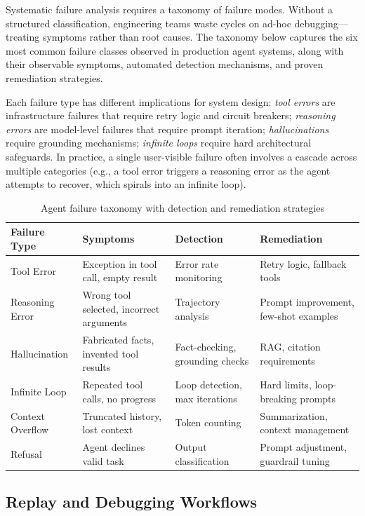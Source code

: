 Systematic failure analysis requires a taxonomy of failure modes. Without a structured classification, engineering teams waste cycles on ad-hoc debugging---treating symptoms rather than root causes. The taxonomy below captures the six most common failure classes observed in production agent systems, along with their observable symptoms, automated detection mechanisms, and proven remediation strategies.

Each failure type has different implications for system design: \emph{tool errors} are infrastructure failures that require retry logic and circuit breakers; \emph{reasoning errors} are model-level failures that require prompt iteration; \emph{hallucinations} require grounding mechanisms; \emph{infinite loops} require hard architectural safeguards. In practice, a single user-visible failure often involves a cascade across multiple categories (e.g., a tool error triggers a reasoning error as the agent attempts to recover, which spirals into an infinite loop).

\begin{table}[ht!]
\centering
\caption{Agent failure taxonomy with detection and remediation strategies}
\begin{tabular}{@{}lp{3.5cm}p{3.5cm}p{6cm}@{}}
\toprule
\textbf{Failure Type} & \textbf{Symptoms} & \textbf{Detection} & \textbf{Remediation} \\
\midrule
Tool Error & Exception in tool call, empty result & Error rate monitoring & Retry logic, fallback tools \\
Reasoning Error & Wrong tool selected, incorrect arguments & Trajectory analysis & Prompt improvement, few-shot examples \\
Hallucination & Fabricated facts, invented tool results & Fact-checking, grounding checks & RAG, citation requirements \\
Infinite Loop & Repeated tool calls, no progress & Loop detection, max iterations & Hard limits, loop-breaking prompts \\
Context Overflow & Truncated history, lost context & Token counting & Summarization, context management \\
Refusal & Agent declines valid task & Output classification & Prompt adjustment, guardrail tuning \\
\bottomrule
\end{tabular}
\end{table}

\subsection{Replay and Debugging Workflows}
\label{replay-and-debugging-workflows}

